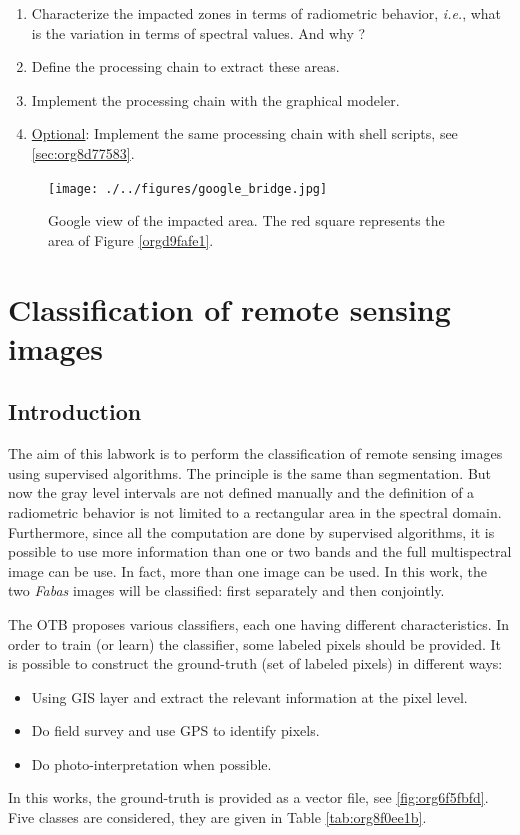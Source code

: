 \documentclass[a4paper,11pt,DIV=18]{scrartcl}
\begin{document}
\begin{work}
\begin{enumerate}
\item Characterize the  impacted zones in terms  of radiometric behavior,
\emph{i.e.}, what is the variation in terms of spectral values. And why ?
\item Define the processing chain to extract these areas.
\item Implement the processing chain with the graphical modeler.
\item \uline{Optional}: Implement  the same processing chain  with shell scripts,
see \ref{sec:org8d77583}.
\end{enumerate}
\end{work}

\begin{figure}[htbp]
\centering
\texttt{[image: ./../figures/google\_bridge.jpg]}
\caption{\label{fig:org73b79f4}
Google view of the impacted area. The red square represents the area of Figure \ref{orgd9fafe1}.}
\end{figure}

\section{Classification of remote sensing images}
\label{sec:org44866fd}
\subsection{Introduction}
\label{sec:orgb4ef676}
The aim  of this labwork  is to  perform the classification  of remote
sensing images using supervised algorithms.  The principle is the same
than segmentation.  But  now the gray level intervals  are not defined
manually and the  definition of a radiometric behavior  is not limited
to a rectangular area in  the spectral domain.  Furthermore, since all
the computation are  done by supervised algorithms, it  is possible to
use more information than one or  two bands and the full multispectral
image can be use.  In fact, more  than one image can be used.  In this
work, the  two \emph{Fabas} images  will be classified: first  separately and
then conjointly.

The  OTB  proposes  various  classifiers, each  one  having  different
characteristics.  In  order to train  (or learn) the  classifier, some
labeled pixels  should be  provided. It is  possible to  construct the
ground-truth (set of labeled pixels) in different ways:
\begin{itemize}
\item Using GIS layer and extract the relevant information at the pixel
level.
\item Do field survey and use GPS to identify pixels.
\item Do photo-interpretation when possible.
\end{itemize}
In this  works, the  ground-truth is  provided as  a vector  file, see
\ref{fig:org6f5fbfd}.   Five  classes  are  considered,  they  are  given  in  Table
\ref{tab:org8f0ee1b}.
\end{document}
